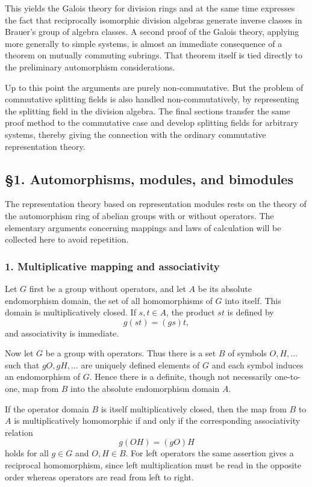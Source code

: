 \documentclass[11pt]{article}
\begin{document}
This yields the Galois theory for division rings and at the same time
expresses the fact that reciprocally isomorphic division algebras
generate inverse classes in Brauer's group of algebra classes. A second
proof of the Galois theory, applying more generally to simple systems,
is almost an immediate consequence of a theorem on mutually commuting
subrings. That theorem itself is tied directly to the preliminary
automorphism considerations.

Up to this point the arguments are purely non-commutative. But the
problem of commutative splitting fields is also handled
non-commutatively, by representing the splitting field in the division
algebra. The final sections transfer the same proof method to the
commutative case and develop splitting fields for arbitrary systems,
thereby giving the connection with the ordinary commutative
representation theory.

\subsection{§1. Automorphisms, modules, and
bimodules}\label{automorphisms-modules-and-bimodules}

The representation theory based on representation modules rests on the
theory of the automorphism ring of abelian groups with or without
operators. The elementary arguments concerning mappings and laws of
calculation will be collected here to avoid repetition.

\subsubsection{1. Multiplicative mapping and
associativity}\label{multiplicative-mapping-and-associativity}

Let \(G\) first be a group without operators, and let \(A\) be its
absolute endomorphism domain, the set of all homomorphisms of \(G\) into
itself. This domain is multiplicatively closed. If \(s,t\in A\), the
product \(st\) is defined by \[
  g(st)=(gs)t,
\] and associativity is immediate.

Now let \(G\) be a group with operators. Thus there is a set \(B\) of
symbols \(O,H,\ldots\) such that \(gO,gH,\ldots\) are uniquely defined
elements of \(G\) and each symbol induces an endomorphism of \(G\).
Hence there is a definite, though not necessarily one-to-one, map from
\(B\) into the absolute endomorphism domain \(A\).

If the operator domain \(B\) is itself multiplicatively closed, then the
map from \(B\) to \(A\) is multiplicatively homomorphic if and only if
the corresponding associativity relation \[
  g(OH)=(gO)H
\] holds for all \(g\in G\) and \(O,H\in B\). For left operators the
same assertion gives a reciprocal homomorphism, since left
multiplication must be read in the opposite order whereas operators are
read from left to right.
\end{document}
